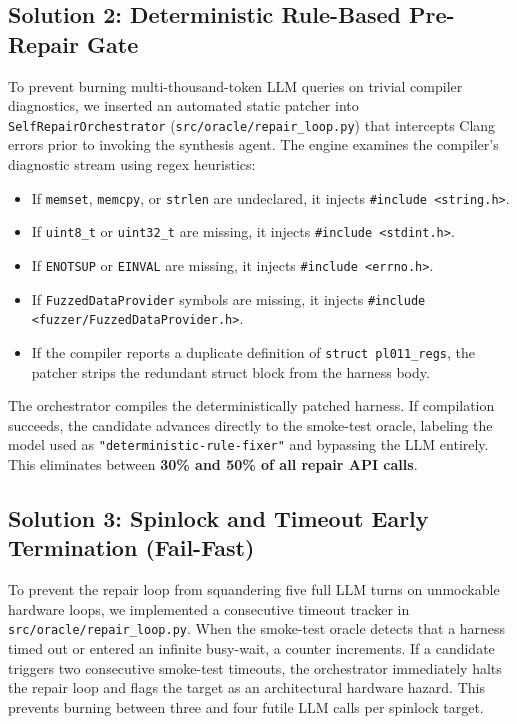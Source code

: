 \documentclass[11pt,a4paper]{article}
\begin{document}
\subsection{Solution 2: Deterministic Rule-Based Pre-Repair Gate}
To prevent burning multi-thousand-token LLM queries on trivial compiler diagnostics, we inserted an automated static patcher into \texttt{SelfRepairOrchestrator} (\texttt{src/oracle/repair\_loop.py}) that intercepts Clang errors prior to invoking the synthesis agent. The engine examines the compiler's diagnostic stream using regex heuristics:
\begin{itemize}[leftmargin=1.8em, itemsep=0.2em]
    \item If \texttt{memset}, \texttt{memcpy}, or \texttt{strlen} are undeclared, it injects \texttt{\#include <string.h>}.
    \item If \texttt{uint8\_t} or \texttt{uint32\_t} are missing, it injects \texttt{\#include <stdint.h>}.
    \item If \texttt{ENOTSUP} or \texttt{EINVAL} are missing, it injects \texttt{\#include <errno.h>}.
    \item If \texttt{FuzzedDataProvider} symbols are missing, it injects \texttt{\#include <fuzzer/FuzzedDataProvider.h>}.
    \item If the compiler reports a duplicate definition of \texttt{struct pl011\_regs}, the patcher strips the redundant struct block from the harness body.
\end{itemize}
The orchestrator compiles the deterministically patched harness. If compilation succeeds, the candidate advances directly to the smoke-test oracle, labeling the model used as \texttt{"deterministic-rule-fixer"} and bypassing the LLM entirely. This eliminates between \textbf{30\% and 50\% of all repair API calls}.

\subsection{Solution 3: Spinlock and Timeout Early Termination (Fail-Fast)}
To prevent the repair loop from squandering five full LLM turns on unmockable hardware loops, we implemented a consecutive timeout tracker in \texttt{src/oracle/repair\_loop.py}. When the smoke-test oracle detects that a harness timed out or entered an infinite busy-wait, a counter increments. If a candidate triggers two consecutive smoke-test timeouts, the orchestrator immediately halts the repair loop and flags the target as an architectural hardware hazard. This prevents burning between three and four futile LLM calls per spinlock target.
\end{document}
